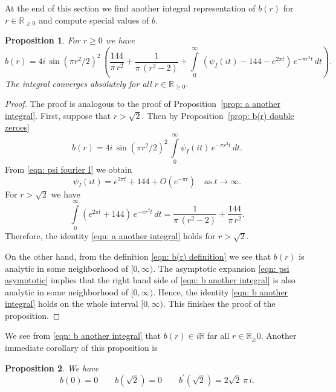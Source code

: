 \documentclass{scrartcl}
\newcommand{\R}{\mathbb{R}}
\newtheorem{proposition}{Proposition}
\begin{document}
At the end of this section we find another integral representation of $b(r)$ for $r\in\R_{\geq0}$ and compute special values of $b$.
\begin{proposition}\label{prop: b another integral}
For $r\geq0$ we have
\begin{equation}\label{eqn: b another integral}b(r)=4i\,\sin(\pi r^2/2)^2\,\left(\frac{144}{\pi\,r^2}+\frac{1}{\pi\,(r^2-2)}+\int\limits_0^\infty\,\left(\psi_I(it)-144-e^{2\pi t}\right)\,e^{-\pi r^2 t}\,dt\right).\end{equation}
The integral converges absolutely for all $r\in\R_{\geq 0}$.
\end{proposition}
\begin{proof}
The proof is analogous to the proof of Proposition~\ref{prop: a another integral}.
First, suppose that $r>\sqrt{2}$. Then by Proposition~\ref{prop: b(r) double zeroes}
$$b(r)=4i\,\sin(\pi r^2/2)^2\,\int\limits_{0}^{\infty}\psi_I(it)\,e^{-\pi r^2 t}\,dt. $$
From \eqref{eqn: psi fourier I} we obtain
\begin{equation}\label{eqn: psi asymptotic}
\psi_I(it)=e^{2\pi t}+144+O(e^{-\pi t})\quad\mbox{as}\;t\to\infty.
\end{equation}
For $r>\sqrt{2}$ we have
\begin{equation}
\int\limits_0^\infty \left(e^{2\pi t}+144\right)\,e^{-\pi r^2 t}\,dt
=\frac{1}{\pi\,(r^2-2)}+\frac{144}{\pi\,r^2}.\end{equation}
Therefore, the identity \eqref{eqn: a another integral} holds for $r>\sqrt{2}$.

On the other hand, from the definition \eqref{eqn: b(r) definition} we see that $b(r)$ is analytic in some neighborhood of $[0,\infty)$. The asymptotic expansion \eqref{eqn: psi asymptotic} implies that the right hand side of \eqref{eqn: b another integral} is also analytic in some neighborhood of $[0,\infty)$. Hence, the identity \eqref{eqn: b another integral} holds on the whole interval $[0,\infty)$. This finishes the proof of the proposition.
\end{proof}
We see from \eqref{eqn: b another integral} that $b(r)\in i\R$ far all $r\in\R_\geq{0}$. Another immediate corollary of this proposition is
\begin{proposition}\label{prop: b values}
We have
\begin{equation}\label{eqn: b values}
b(0)=0\qquad
b(\sqrt{2})=0\qquad
b^\prime(\sqrt{2})=2\sqrt{2}\,\pi\,i.
\end{equation}
\end{proposition}
\end{document}
